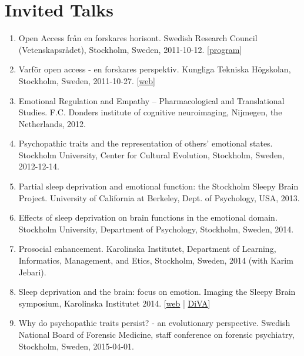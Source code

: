 \documentclass[10pt,a4paper,twocolumn]{article}
\begin{document}
\section{Invited Talks}
\begin{enumerate}

    \item Open Access från en forskares horisont. Swedish Research Council (Vetenskapsrådet), Stockholm, Sweden, 2011-10-12. [\href{http://www.kb.se/Dokument/Bibliotek/utbildning/2011/Openaccesskrav_dialog12%20okt%20Uppdaterat.pdf}{program}]

    \item Varför open access - en forskares perspektiv. Kungliga Tekniska Högskolan, Stockholm, Sweden, 2011-10-27. [\href{https://www.kth.se/kthb/publicering/open-access/open-access-week/open-access-week-2011-1.546646}{web}]

    \item Emotional Regulation and Empathy – Pharmacological and Translational Studies. F.C. Donders institute of cognitive neuroimaging, Nijmegen, the Netherlands, 2012.

    \item Psychopathic traits and the representation of others’ emotional states. Stockholm University, Center for Cultural Evolution, Stockholm, Sweden, 2012-12-14.

    \item Partial sleep deprivation and emotional function: the Stockholm Sleepy Brain Project. University of California at Berkeley, Dept. of Psychology, USA, 2013.

    \item Effects of sleep deprivation on brain functions in the emotional domain. Stockholm University, Department of Psychology, Stockholm, Sweden, 2014.

    \item Prosocial enhancement. Karolinska Institutet, Department of Learning, Informatics, Management, and Etics, Stockholm, Sweden, 2014 (with Karim Jebari).

    \item Sleep deprivation and the brain: focus on emotion. Imaging the Sleepy Brain symposium, Karolinska Institutet 2014. [\href{http://ki.se/en/cns/calendar/imaging-the-sleepy-brain}{web} | \href{http://www.diva-portal.org/smash/record.jsf?pid=diva2%3A775077\&dswid=-7532}{DiVA}]

    \item Why do psychopathic traits persist? - an evolutionary perspective. Swedish National Board of Forensic Medicine, staff conference on forensic psychiatry, Stockholm, Sweden, 2015-04-01.


\end{enumerate}
\end{document}
